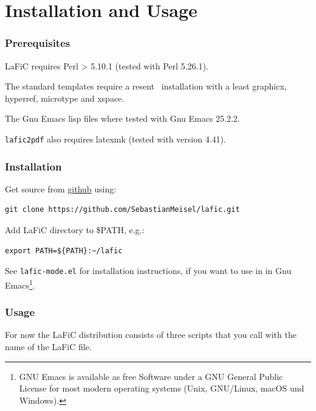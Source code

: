 \documentclass{article}
\begin{document}
\part{Installation and Usage}

\section{Prerequisites}

{LaFiC requires Perl > 5.10.1 (tested with Perl 5.26.1).\\}

{The standard templates require a resent \XeLaTeX\  installation
with a least graphicx, hyperref, microtype and xspace.\\}

{The Gnu Emacs lisp files where tested with Gnu Emacs 25.2.2.\\}

{\texttt{lafic2pdf} also requires latexmk (tested with version 4.41).\\}

\section{Installation}
\label{installation}

{Get source from \href{https://github.com/SebastianMeisel/lafics}{github} using:\\}

\begin{verbatim}
git clone https://github.com/SebastianMeisel/lafic.git
\end{verbatim}


{Add LaFiC directory to \$PATH, e.g.:\\}

\begin{verbatim}
export PATH=${PATH}:~/lafic
\end{verbatim}


{See \texttt{lafic-mode.el} for installation instructions, if you want
to use in in Gnu Emacs\footnote{GNU Emacs is available as free Software under a GNU General Public License for most modern operating systems (Unix, GNU/Linux, macOS und Windows).}\xspace .\\}

\section{Usage}

{For now the LaFiC distribution consists of three scripts
that you call with the name of the LaFiC file.\\}
\end{document}
